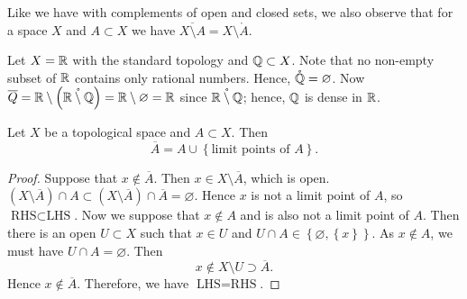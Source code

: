 Like we have with complements of open and closed sets, we also observe that
for a space $X$ and $A \subset X$ we have
$
	\overline{X \setminus A} = X \setminus \mathring A
$.

\begin{example}[]
	Let $X = \mathbb{R}$ with the standard topology and $\mathbb{Q} \subset X$.
	Note that no non-empty subset of $\mathbb{R}$ contains only rational numbers.
	Hence, $\mathring {\mathbb{Q}} = \varnothing$.
	Now 
	$
		\overline Q = 
		\mathbb{R} \setminus \left( \mathring{\mathbb{R} \setminus \mathbb{Q}} \right) = 
		\mathbb{R} \setminus \varnothing = \mathbb{R}
	$
	since $\mathring{\mathbb{R} \setminus \mathbb{Q}}$; hence, $\mathbb{Q}$ is dense in $\mathbb{R}$.
\end{example}

\begin{lemma}[]
	Let $X$ be a topological space and $A \subset X$.
	Then
	\[
		\overline A = A \cup \left\{ \text{limit points of $A$} \right\}.
	\]
\end{lemma}

\begin{proof}
	Suppose that $x \not\in \overline A$.
	Then $x \in X \setminus \overline A$, which is open.
	$
		(X \setminus \overline A) \cap A \subset 
		(X \setminus \overline A) \cap \overline A =
		\varnothing.
	$
	Hence $x$ is not a limit point of $A$, so $\text{RHS} \subset \text{LHS}$.
	Now we suppose that $x \not\in A$ and is also not a limit point of $A$.
	Then there is an open $U \subset X$ such that $x \in U$ and
	$U \cap A \in \left\{ \varnothing, \left\{ x \right\} \right\}$.
	As $x \not\in A$, we must have $U \cap A = \varnothing$.
	Then
	\[
		x \not\in X \setminus U \supset
		\overline A.
	\]
	Hence $x \not\in \overline A$.
	Therefore, we have $\text{LHS} = \text{RHS}$.
\end{proof}

